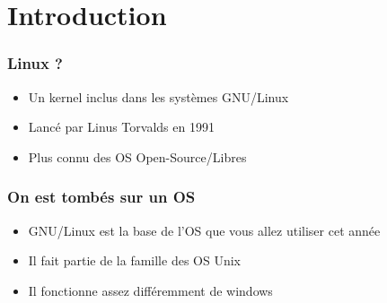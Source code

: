 \section*{Introduction}

\begin{frame}
    \frametitle{Linux ?}
        \begin{itemize}
            \item Un kernel inclus dans les systèmes GNU/Linux
            \item Lancé par Linus Torvalds en 1991
            \item Plus connu des OS Open-Source/Libres
        \end{itemize}
\end{frame}

\begin{frame}
	\frametitle{On est tombés sur un OS}
        \begin{itemize}
            \item GNU/Linux est la base de l'OS que vous allez utiliser cet année
            \item Il fait partie de la famille des OS Unix
            \item Il fonctionne assez différemment de windows 
        \end{itemize}
\end{frame}
